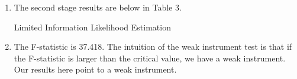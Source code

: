 \documentclass{article}
\begin{document}
\begin{enumerate}

\item The second stage results are below in Table 3.\\


\begin{table}
\caption{Limited Information Likelihood Estimation}
    \centering
    
\end{table}
    

\item The F-statistic is 37.418. The intuition of the weak instrument test is that if the F-statistic is larger than the critical value, we have a weak instrument. Our results here point to a weak instrument.     
   
\end{enumerate}
   
\end{document}
